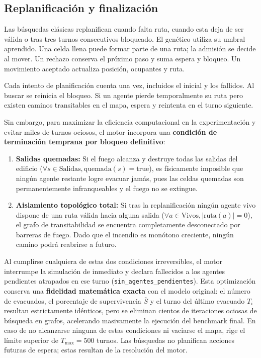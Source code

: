 \documentclass[11pt,letterpaper]{article}
\begin{document}
\subsection{Replanificación y finalización}
Las búsquedas clásicas replanifican cuando falta ruta, cuando esta deja de ser válida o tras tres turnos consecutivos bloqueado. El genético utiliza su umbral aprendido. Una celda llena puede formar parte de una ruta; la admisión se decide al mover. Un rechazo conserva el próximo paso y suma espera y bloqueo. Un movimiento aceptado actualiza posición, ocupantes y ruta.

Cada intento de planificación cuenta una vez, incluidos el inicial y los fallidos. Al buscar se reinicia el bloqueo. Si un agente pierde temporalmente su ruta pero existen caminos transitables en el mapa, espera y reintenta en el turno siguiente. 

Sin embargo, para maximizar la eficiencia computacional en la experimentación y evitar miles de turnos ociosos, el motor incorpora una \textbf{condición de terminación temprana por bloqueo definitivo}:
\begin{enumerate}
    \item \textbf{Salidas quemadas:} Si el fuego alcanza y destruye todas las salidas del edificio ($\forall s \in \text{Salidas}, \text{quemada}(s) = \text{true}$), es físicamente imposible que ningún agente restante logre evacuar jamás, pues las celdas quemadas son permanentemente infranqueables y el fuego no se extingue.
    \item \textbf{Aislamiento topológico total:} Si tras la replanificación ningún agente vivo dispone de una ruta válida hacia alguna salida ($\forall a \in \text{Vivos}, |\text{ruta}(a)| = 0$), el grafo de transitabilidad se encuentra completamente desconectado por barreras de fuego. Dado que el incendio es monótono creciente, ningún camino podrá reabrirse a futuro.
\end{enumerate}
Al cumplirse cualquiera de estas dos condiciones irreversibles, el motor interrumpe la simulación de inmediato y declara fallecidos a los agentes pendientes atrapados en ese turno (\texttt{sin\_agentes\_pendientes}). Esta optimización conserva una \textbf{fidelidad matemática exacta} con el modelo original: el número de evacuados, el porcentaje de supervivencia $\overline{S}$ y el turno del último evacuado $T_i$ resultan estrictamente idénticos, pero se eliminan cientos de iteraciones ociosas de búsqueda en grafos, acelerando masivamente la ejecución del benchmark final. En caso de no alcanzarse ninguna de estas condiciones ni vaciarse el mapa, rige el límite superior de $T_{\max} = 500$ turnos. Las búsquedas no planifican acciones futuras de espera; estas resultan de la resolución del motor.
\end{document}
